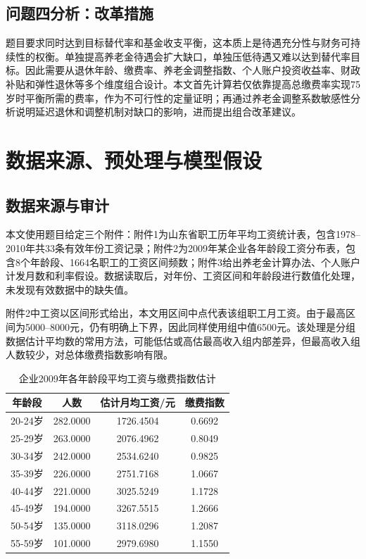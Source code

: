 \documentclass[UTF8,12pt,a4paper]{ctexart}
\begin{document}
\subsection{问题四分析：改革措施}
题目要求同时达到目标替代率和基金收支平衡，这本质上是待遇充分性与财务可持续性的权衡。单独提高养老金待遇会扩大缺口，单独压低待遇又难以达到替代率目标。因此需要从退休年龄、缴费率、养老金调整指数、个人账户投资收益率、财政补贴和弹性退休等多个维度组合设计。本文首先计算若仅依靠提高总缴费率实现75岁时平衡所需的费率，作为不可行性的定量证明；再通过养老金调整系数敏感性分析说明延迟退休和调整机制对缺口的影响，进而提出组合改革建议。

\section{数据来源、预处理与模型假设}
\subsection{数据来源与审计}
本文使用题目给定三个附件：附件1为山东省职工历年平均工资统计表，包含1978--2010年共33条有效年份工资记录；附件2为2009年某企业各年龄段工资分布表，包含8个年龄段、1664名职工的工资区间频数；附件3给出养老金计算办法、个人账户计发月数和利率假设。数据读取后，对年份、工资区间和年龄段进行数值化处理，未发现有效数据中的缺失值。

附件2中工资以区间形式给出，本文用区间中点代表该组职工月工资。由于最高区间为5000--8000元，仍有明确上下界，因此同样使用组中值6500元。该处理是分组数据估计平均数的常用方法，可能低估或高估最高收入组内部差异，但最高收入组人数较少，对总体缴费指数影响有限。

\begin{table}[H]
\centering
\caption{企业2009年各年龄段平均工资与缴费指数估计}
\begin{tabular}{cccc}
\toprule
年龄段 & 人数 & 估计月均工资/元 & 缴费指数 \\
\midrule
20-24岁 & 282.0000 & 1726.4504 & 0.6692 \\
25-29岁 & 263.0000 & 2076.4962 & 0.8049 \\
30-34岁 & 242.0000 & 2534.6240 & 0.9825 \\
35-39岁 & 226.0000 & 2751.7168 & 1.0667 \\
40-44岁 & 221.0000 & 3025.5249 & 1.1728 \\
45-49岁 & 194.0000 & 3267.5515 & 1.2666 \\
50-54岁 & 135.0000 & 3118.0296 & 1.2087 \\
55-59岁 & 101.0000 & 2979.6980 & 1.1550 \\
\bottomrule
\end{tabular}
\end{table}
\end{document}
